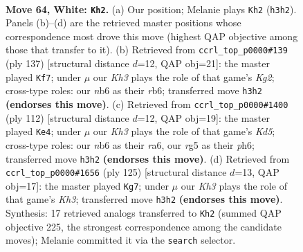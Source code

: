 \documentclass[11pt]{article}
\begin{document}
\clearpage

\begin{figure}[p]\centering
\begin{subfigure}{0.46\textwidth}\centering
\resizebox{\linewidth}{!}{%
\newchessgame
\chessboard[
  setfen={5k2/8/1n6/6rp/p2R4/P6K/8/8 w - - 5 64},
  showmover=false,
  pgfstyle=straightmove, color=movearrow, markmove={h3-h2}
]}
\caption{}
\end{subfigure}\hfill
\begin{subfigure}{0.46\textwidth}\centering
\resizebox{\linewidth}{!}{%
\newchessgame
\chessboard[
  setfen={8/6k1/PR6/8/6p1/r7/5PK1/8 b - - 25 69},
  showmover=false,
  pgfstyle=straightmove, color=movearrow, markmove={g7-f7}
]}
\caption{}
\end{subfigure}
\\[4pt]
\begin{subfigure}{0.46\textwidth}\centering
\resizebox{\linewidth}{!}{%
\newchessgame
\chessboard[
  setfen={6k1/8/r4p1p/3K3P/8/5R2/8/8 w - - 0 57},
  showmover=false,
  pgfstyle=straightmove, color=movearrow, markmove={d5-e4}
]}
\caption{}
\end{subfigure}\hfill
\begin{subfigure}{0.46\textwidth}\centering
\resizebox{\linewidth}{!}{%
\newchessgame
\chessboard[
  setfen={8/1p6/4K2k/2P5/4N1P1/8/8/2r5 b - - 1 63},
  showmover=false,
  pgfstyle=straightmove, color=movearrow, markmove={h6-g7}
]}
\caption{}
\end{subfigure}
\caption{\textbf{Move 64, White: \texttt{Kh2}.} (a) Our position; Melanie plays \texttt{Kh2} (\texttt{h3h2}). Panels (b)--(d) are the retrieved master positions whose correspondence most drove this move (highest QAP objective among those that transfer to it). (b) Retrieved from \texttt{ccrl\_top\_p0000\#139} (ply 137) [structural distance $d$=12, QAP obj=21]: the master played \texttt{Kf7}; under $\mu$ our \emph{Kh3} plays the role of that game's \emph{Kg2}; cross-type roles: our \emph{n}b6 as their \emph{r}b6; transferred move \texttt{h3h2} \textbf{(endorses this move)}. (c) Retrieved from \texttt{ccrl\_top\_p0000\#1400} (ply 112) [structural distance $d$=12, QAP obj=19]: the master played \texttt{Ke4}; under $\mu$ our \emph{Kh3} plays the role of that game's \emph{Kd5}; cross-type roles: our \emph{n}b6 as their \emph{r}a6, our \emph{r}g5 as their \emph{p}h6; transferred move \texttt{h3h2} \textbf{(endorses this move)}. (d) Retrieved from \texttt{ccrl\_top\_p0000\#1656} (ply 125) [structural distance $d$=13, QAP obj=17]: the master played \texttt{Kg7}; under $\mu$ our \emph{Kh3} plays the role of that game's \emph{Kh3}; transferred move \texttt{h3h2} \textbf{(endorses this move)}. Synthesis: 17 retrieved analogs transferred to \texttt{Kh2} (summed QAP objective 225, the strongest correspondence among the candidate moves); Melanie committed it via the \texttt{search} selector.}
\label{fig:thought-m126}
\end{figure}
\end{document}
